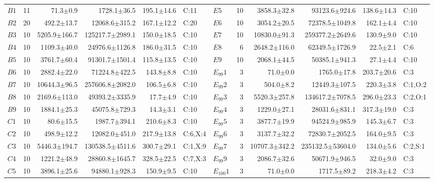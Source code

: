 \begin{table}[!b]
\begin{tabular}{@{}lrrrrl@{\hspace{3pt}}lrrrrl@{}}
$B1$ & 11 & 71.3$\pm$0.9 & 1728.1$\pm$36.5 & 195.1$\pm$14.6 & C:11 & $E5$ & 10 & 3858.3$\pm$32.8 & 93123.6$\pm$924.6 & 138.6$\pm$14.3 & C:10 \\
$B2$ & 20 & 492.2$\pm$13.7 & 12068.6$\pm$315.2 & 167.1$\pm$12.2 & C:20 & $E6$ & 10 & 3054.2$\pm$20.5 & 72378.5$\pm$1049.8 & 162.1$\pm$4.4 & C:10 \\
$B3$ & 10 & 5205.9$\pm$166.7 & 125217.7$\pm$2989.1 & 150.0$\pm$18.5 & C:10 & $E7$ & 10 & 10830.0$\pm$91.3 & 259377.2$\pm$2649.6 & 130.9$\pm$9.0 & C:10 \\
$B4$ & 10 & 1109.3$\pm$40.0 & 24976.6$\pm$1126.8 & 186.0$\pm$31.5 & C:10 & $E8$ & 6 & 2648.2$\pm$116.0 & 62349.5$\pm$1726.9 & 22.5$\pm$2.1 & C:6 \\
$B5$ & 10 & 3761.7$\pm$60.4 & 91301.7$\pm$1501.4 & 115.8$\pm$13.5 & C:10 & $E9$ & 10 & 2068.1$\pm$44.5 & 50385.1$\pm$941.3 & 27.1$\pm$4.4 & C:10 \\
$B6$ & 10 & 2882.4$\pm$22.0 & 71224.8$\pm$422.5 & 143.8$\pm$8.8 & C:10 & $E_{99}1$ & 3 & 71.0$\pm$0.0 & 1765.0$\pm$17.8 & 203.7$\pm$20.6 & C:3 \\
$B7$ & 10 & 10644.3$\pm$96.5 & 257606.8$\pm$2082.0 & 106.5$\pm$6.8 & C:10 & $E_{99}2$ & 3 & 504.0$\pm$8.2 & 12449.3$\pm$107.5 & 220.3$\pm$3.8 & C:1,O:2 \\
$B8$ & 10 & 2169.6$\pm$113.0 & 49393.2$\pm$3335.9 & 17.7$\pm$4.9 & C:10 & $E_{99}3$ & 3 & 5520.3$\pm$257.8 & 134617.2$\pm$7078.5 & 296.0$\pm$23.3 & C:2,O:1 \\
$B9$ & 10 & 1884.1$\pm$25.3 & 45075.8$\pm$729.3 & 14.3$\pm$3.1 & C:10 & $E_{99}4$ & 3 & 1229.0$\pm$27.1 & 28031.6$\pm$831.1 & 317.3$\pm$19.0 & C:3 \\
$C1$ & 10 & 80.6$\pm$15.5 & 1987.7$\pm$394.1 & 210.6$\pm$8.3 & C:10 & $E_{99}5$ & 3 & 3877.7$\pm$19.9 & 94524.9$\pm$985.9 & 145.3$\pm$6.7 & C:3 \\
$C2$ & 10 & 498.9$\pm$12.2 & 12082.0$\pm$451.0 & 217.9$\pm$13.8 & C:6,X:4 & $E_{99}6$ & 3 & 3137.7$\pm$32.2 & 72830.7$\pm$2052.5 & 164.0$\pm$9.5 & C:3 \\
$C3$ & 10 & 5446.3$\pm$194.7 & 130538.5$\pm$4511.6 & 300.7$\pm$29.1 & C:1,X:9 & $E_{99}7$ & 3 & 10707.3$\pm$342.2 & 235132.5$\pm$53604.0 & 134.0$\pm$5.6 & C:2,S:1 \\
$C4$ & 10 & 1221.2$\pm$48.9 & 28860.8$\pm$1645.7 & 328.5$\pm$22.5 & C:7,X:3 & $E_{99}9$ & 3 & 2086.7$\pm$32.6 & 50671.9$\pm$946.5 & 32.0$\pm$9.0 & C:3 \\
$C5$ & 10 & 3896.1$\pm$25.6 & 94880.1$\pm$928.3 & 150.9$\pm$9.5 & C:10 & $E_{100}1$ & 3 & 71.0$\pm$0.0 & 1717.5$\pm$89.2 & 218.3$\pm$4.2 & C:3 \\

\end{tabular}
\end{table}
